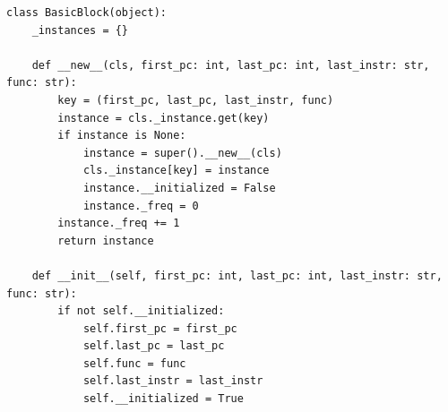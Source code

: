 \medskip
\begin{table}[h!]
    \centering
    \caption{Comparison of total memory usage of \texttt{BasicBlock} instances}
    \label{tab:comparison_mem_usage}
\end{table}

\medskip
\begin{center}
\begin{minipage}{\textwidth}
\begin{lstlisting}
class BasicBlock(object):
    _instances = {}

    def __new__(cls, first_pc: int, last_pc: int, last_instr: str, func: str):
        key = (first_pc, last_pc, last_instr, func)
        instance = cls._instance.get(key)
        if instance is None:
            instance = super().__new__(cls)
            cls._instance[key] = instance
            instance.__initialized = False
            instance._freq = 0
        instance._freq += 1
        return instance

    def __init__(self, first_pc: int, last_pc: int, last_instr: str, func: str):
        if not self.__initialized:
            self.first_pc = first_pc
            self.last_pc = last_pc
            self.func = func
            self.last_instr = last_instr
            self.__initialized = True

\end{lstlisting}
\end{minipage}
\end{center}


